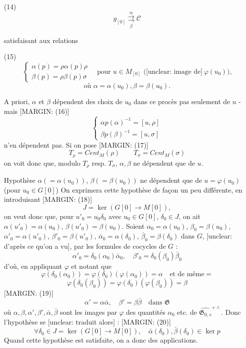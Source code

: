 (14) $$ g_{[0]} \overset{\alpha}{\underset{\beta}{\rightrightarrows}} \mathcal{C} $$

satisfaisant aux relations

(15) $$ \begin{cases} \alpha(p) = \rho \alpha(p) \rho \\ \beta(p) = \rho \beta(p) \sigma \end{cases} \quad \text{pour } u \in M_{[0]} \text{ (} \text{[unclear: image de]} \ \varphi(u_0)\text{),} $$
$$ \text{où } \alpha = \alpha(u_0), \beta = \beta(u_0). $$

\newpage


A priori, $\alpha$ et $\beta$ dépendent des choix de $u_0$ dans ce procès
pas seulement de $u$ - mais
[MARGIN: (16)]
$$ \begin{cases} \alpha p(\alpha)^{-1} = [u, \rho] \\ \beta p(\beta)^{-1} = [u, \sigma] \end{cases} $$
n'en dépendent pas. Si on pose
[MARGIN: (17)]
$$ T_\rho = Cent_M(\rho) \qquad T_\sigma = Cent_M(\sigma) $$
on voit donc que, modulo $T_\rho$ resp. $T_\sigma$, $\alpha, \beta$ ne dépendent
que de $u$.

Hypothèse $\alpha (= \alpha(u_0))$, $\beta (= \beta(u_0))$ ne dépendent que de $u = \varphi(u_0)$ (pour $u_0 \in G[0]$)
On exprimera cette hypothèse de façon un peu
différente, en introduisant
[MARGIN: (18)]
$$ J = \ker(G[0] \longrightarrow M[0]) , $$
on veut donc que, pour
$u'_0 = u_0 \delta_0$ avec $u_0 \in G[0]$, $\delta_0 \in J$, on ait
$\alpha(u'_0) = \alpha(u_0)$, $\beta(u'_0) = \beta(u_0)$.
Soient $\alpha_0 = \alpha(u_0)$, $\beta_0 = \beta(u_0)$, $\alpha'_0 = \alpha(u'_0)$, $\beta'_0 = \beta(u'_0)$, $\bar{\alpha}_0 = \alpha(\delta_0)$, $\bar{\beta}_0 = \beta(\delta_0)$
dans $G$,
[unclear: d'après ce qu'on a vu], par les formules de cocycles de $G$ :
$$ \alpha'_0 = \delta_0(\alpha_0) \bar{\alpha}_0 , \quad \beta'_0 = \delta_0(\beta_0) \bar{\beta}_0 $$
d'où, en appliquant $\varphi$ et notant que
$$ \varphi(\delta_0(\alpha_0)) = \varphi(\delta_0) (\varphi(\alpha_0)) = \alpha \quad \text{et de même} = $$
$$ \varphi(\delta_0(\beta_0)) = \varphi(\delta_0) (\varphi(\beta_0)) = \beta $$
[MARGIN: (19)]
$$ \alpha' = \alpha \bar{\alpha} , \quad \beta' = \beta \bar{\beta} \quad \text{dans } \mathfrak{G} $$
où $\alpha, \beta, \alpha', \beta', \bar{\alpha}, \bar{\beta}$ sont les images par $\varphi$ des quantités
$\alpha_0$ etc. de $\widehat{\mathfrak{G}_{0,s}}^{+\wedge}$. Donc l'hypothèse
se [unclear: traduit alors] :
[MARGIN: (20)]
$$ \forall \delta_0 \in J = \ker(G[0] \to M[0]) , \quad \bar{\alpha}(\delta_0), \bar{\beta}(\delta_0) \in \ker p $$
Quand cette hypothèse est satisfaite, on a donc des
applications.

